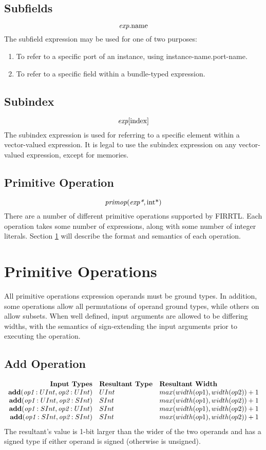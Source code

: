 \documentclass[12pt]{article}
\begin{document}
\subsection{Subfields}
\[
\text{\em exp}.\text{name}
\]
The subfield expression may be used for one of two purposes:
\begin{enumerate}
\item To refer to a specific port of an instance, using instance-name.port-name. 
\item To refer to a specific field within a bundle-typed expression.
\end{enumerate}

\subsection{Subindex}
\[
\text{\em exp}[\text{index}]
\]
The subindex expression is used for referring to a specific element within a vector-valued expression.
It is legal to use the subindex expression on any vector-valued expression, except for memories. 

\subsection{Primitive Operation}
\[
\text{\em primop}(\text{\em exp*}, \text{int}\text{*})
\]
There are a number of different primitive operations supported by FIRRTL. 
Each operation takes some number of expressions, along with some number of integer literals.
Section \ref{primitives} will describe the format and semantics of each operation.


\section{Primitive Operations} \label{primitives}

All primitive operations expression operands must be ground types.
In addition, some operations allow all permutations of operand ground types, while others on allow subsets.
When well defined, input arguments are allowed to be differing widths, with the semantics of sign-extending the input arguments prior to executing the operation.

\subsection{Add Operation}
\[
\begin{array}{rll}
\text{\bf Input Types} & \text{\bf Resultant Type} & \text{\bf Resultant Width} \\
\text{\bf add}(\text{\em op1}:UInt, \text{\em op2}:UInt) & UInt & max(width(op1),width(op2)) + 1 \\
\text{\bf add}(\text{\em op1}:UInt, \text{\em op2}:SInt) & SInt & max(width(op1),width(op2)) + 1 \\
\text{\bf add}(\text{\em op1}:SInt, \text{\em op2}:UInt) & SInt & max(width(op1),width(op2)) + 1 \\
\text{\bf add}(\text{\em op1}:SInt, \text{\em op2}:SInt) & SInt & max(width(op1),width(op2)) + 1 \\
\end{array}
\]
The resultant's value is 1-bit larger than the wider of the two operands and has a signed type if either operand is signed (otherwise is unsigned).
\end{document}
